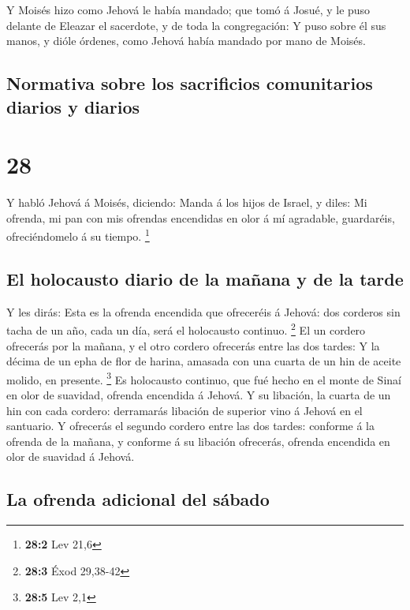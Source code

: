  Y Moisés hizo como Jehová le había mandado; que tomó á
Josué, y le puso delante de Eleazar el sacerdote, y de toda la
congregación:  Y puso sobre él sus manos, y dióle órdenes,
como Jehová había mandado por mano de Moisés.

\hypertarget{normativa-sobre-los-sacrificios-comunitarios-diarios-y-diarios}{%
\subsection{Normativa sobre los sacrificios comunitarios diarios y
diarios}\label{normativa-sobre-los-sacrificios-comunitarios-diarios-y-diarios}}

\hypertarget{section-27}{%
\section{28}\label{section-27}}

 Y habló Jehová á Moisés, diciendo:  Manda á los
hijos de Israel, y diles: Mi ofrenda, mi pan con mis ofrendas encendidas
en olor á mí agradable, guardaréis, ofreciéndomelo á su tiempo.
\footnote{\textbf{28:2} Lev 21,6}

\hypertarget{el-holocausto-diario-de-la-mauxf1ana-y-de-la-tarde}{%
\subsection{El holocausto diario de la mañana y de la
tarde}\label{el-holocausto-diario-de-la-mauxf1ana-y-de-la-tarde}}

 Y les dirás: Esta es la ofrenda encendida que ofreceréis á
Jehová: dos corderos sin tacha de un año, cada un día, será el
holocausto continuo. \footnote{\textbf{28:3} Éxod 29,38-42} 
El un cordero ofrecerás por la mañana, y el otro cordero ofrecerás entre
las dos tardes:  Y la décima de un epha de flor de harina,
amasada con una cuarta de un hin de aceite molido, en presente.
\footnote{\textbf{28:5} Lev 2,1}  Es holocausto continuo,
que fué hecho en el monte de Sinaí en olor de suavidad, ofrenda
encendida á Jehová.  Y su libación, la cuarta de un hin con
cada cordero: derramarás libación de superior vino á Jehová en el
santuario.  Y ofrecerás el segundo cordero entre las dos
tardes: conforme á la ofrenda de la mañana, y conforme á su libación
ofrecerás, ofrenda encendida en olor de suavidad á Jehová.

\hypertarget{la-ofrenda-adicional-del-suxe1bado}{%
\subsection{La ofrenda adicional del
sábado}\label{la-ofrenda-adicional-del-suxe1bado}}

